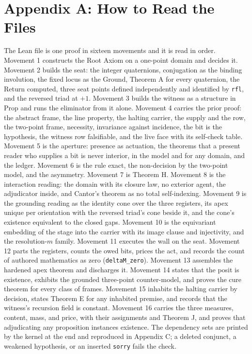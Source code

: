 \documentclass[10pt,twocolumn]{article}
\begin{document}
\hypertarget{appendix-a-how-to-read-the-files}{%
\section{Appendix A: How to Read the
Files}\label{appendix-a-how-to-read-the-files}}

The Lean file is one proof in sixteen movements and it is read in order.
Movement 1 constructs the Root Axiom on a one-point domain and decides
it. Movement 2 builds the seat: the integer quaternions, conjugation as
the binding involution, the fixed locus as the Ground, Theorem A for
every quaternion, the Return computed, three seat points defined
independently and identified by \texttt{rfl}, and the reversed triad at
\(+1\). Movement 3 builds the witness as a structure in Prop and runs
the eliminator from it alone. Movement 4 carries the prior proof: the
abstract frame, the line property, the halting carrier, the supply and
the row, the two-point frame, necessity, invariance against incidence,
the bit is the hypothesis, the witness row falsifiable, and the live
face with its self-check table. Movement 5 is the aperture: presence as
actuation, the theorems that a present reader who supplies a bit is
never interior, in the model and for any domain, and the ledger.
Movement 6 is the rule exact, the non-decision by the two-point model,
and the asymmetry. Movement 7 is Theorem H. Movement 8 is the
interaction reading: the domain with its closure law, no exterior agent,
the adjudicator inside, and Cantor's theorem as no total self-indexing.
Movement 9 is the grounding reading as the identity cone over the three
registers, its apex unique per orientation with the reversed triad's
cone beside it, and the cone's existence equivalent to the closed gaps.
Movement 10 is the equivariant embedding of the stage into the carrier
with its image clause and injectivity, and the resolution-\(m\) family.
Movement 11 executes the wall on the seat. Movement 12 parts the
registers, counts the owed bits, prices the act, and records the count
of authored mathematics as zero (\texttt{deltaM\_\allowbreak zero}).
Movement 13 assembles the hardened apex theorem and discharges it.
Movement 14 states that the posit is existence, exhibits the grounded
three-point counter-model, and proves the cure theorem for every class
of frames. Movement 15 inhabits the halting carrier by decision, states
Theorem E for any inhabited premise, and records that the witness's
recursion field is constant. Movement 16 carries the three measures,
content, mass, and price, with their assignments and Theorem J, and
proves that adjudicating any proposition instances existence. The
dependency sets are printed by the kernel at the end and reproduced in
Appendix C; a deleted conjunct, a weakened hypothesis, or an inserted
\texttt{sorry} fails the check.
\end{document}
